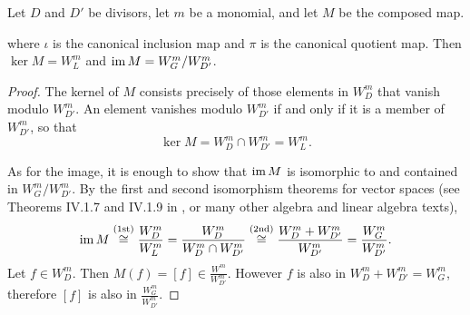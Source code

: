 \begin{theorem}
  Let $D$ and $D'$ be divisors, let $m$ be a monomial, and let $M$ be the composed map.
  \begin{center}
  \end{center}
  where $\iota$ is the canonical inclusion map and $\pi$ is the canonical quotient map.
  Then $\ker M = W_L^m$ and $\operatorname{im} M = W_G^m / W_{D'}^m$.
  \begin{center}
  \end{center}
\end{theorem}
\begin{proof}
  The kernel of $M$ consists precisely of those elements in $W_D^m$ that vanish modulo $W_{D'}^m$.
  An element vanishes modulo $W_{D'}^m$ if and only if it is a member of $W_{D'}^m$, so that
  \[ \ker M = W_D^m \cap W_{D'}^m = W_L^m. \]

  As for the image, it is enough to show that $\operatorname{im} M$ is isomorphic to and contained in $W_G^m / W_{D'}^m$.
  By the first and second isomorphism theorems for vector spaces
  (see Theorems IV.1.7 and IV.1.9 in \cite{hungerford}, or many other algebra and linear algebra texts),
  \[ \operatorname{im} M \overset{\text{(1st)}}{\cong} \frac {W_D^m} {W_L^m}
           = \frac {W_D^m} {W_D^m \cap W_{D'}^m}
           \overset{\text{(2nd)}}{\cong} \frac {W_D^m + W_{D'}^m} {W_{D'}^m}
           = \frac {W_G^m} {W_{D'}^m}. \]
  Let $f \in W_D^m$.
  Then $M(f) = [f] \in \frac {W^m} {W_{D'}^m}$.
  However $f$ is also in $W_D^m + W_{D'}^m = W_G^m$,
  therefore $[f]$ is also in $\frac {W_G^m} {W_{D'}^m}$.
\end{proof}

\begin{comment}
Since $D'$ is assumed to be reduced and therefore one of only a few possible types,
we can write $\im M$ even more explicitly.
\[
  \im M = \begin{cases}
    W_G^1 & \type(D') = 11 \\
    W_G^x & \type(D') = 21 \\
    W_G^y \cap \Span\{ 1, y \} & \type(D') = 22 \\
    W_G^y & \type(D') = 31
  \end{cases}.
\]
\end{comment}

